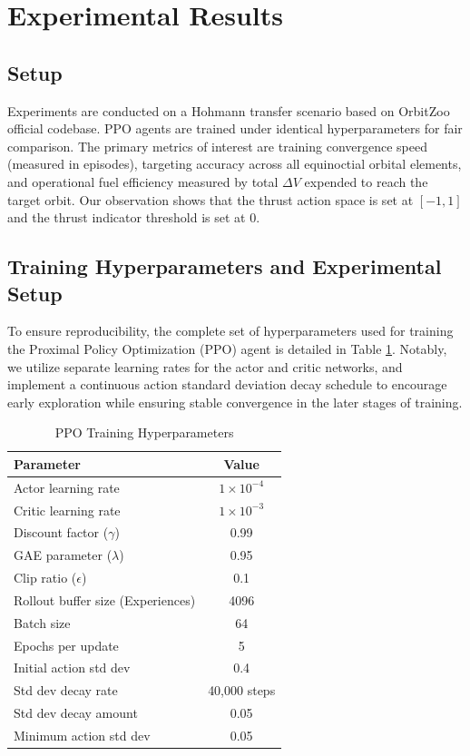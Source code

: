 \documentclass[paper]{ieice}
\begin{document}
\section{Experimental Results}
\label{Results}

\subsection{Setup}
Experiments are conducted on a Hohmann transfer scenario based on OrbitZoo official codebase. PPO agents are trained under identical hyperparameters for fair comparison. The primary metrics of interest are training convergence speed (measured in episodes), targeting accuracy across all equinoctial orbital elements, and operational fuel efficiency measured by total $\Delta V$ expended to reach the target orbit. Our observation shows that the thrust action space is set at $[-1, 1]$ and the thrust indicator threshold is set at $0$.\cite{orbitzoo}

\subsection{Training Hyperparameters and Experimental Setup}
To ensure reproducibility, the complete set of hyperparameters used for training the Proximal Policy Optimization (PPO) agent is detailed in Table \ref{tab:ppo_params}. Notably, we utilize separate learning rates for the actor and critic networks, and implement a continuous action standard deviation decay schedule to encourage early exploration while ensuring stable convergence in the later stages of training.

\begin{table}[tb]
\caption{PPO Training Hyperparameters}
\label{tab:ppo_params}
\begin{center}
\begin{tabular}{|l|c|}
\hline
\textbf{Parameter} & \textbf{Value} \\
\hline
Actor learning rate & $1 \times 10^{-4}$ \\
Critic learning rate & $1 \times 10^{-3}$ \\
Discount factor ($\gamma$) & 0.99 \\
GAE parameter ($\lambda$) & 0.95 \\
Clip ratio ($\epsilon$) & 0.1 \\
Rollout buffer size (Experiences) & 4096 \\
Batch size & 64 \\
Epochs per update & 5 \\
Initial action std dev & 0.4 \\
Std dev decay rate & 40,000 steps \\
Std dev decay amount & 0.05 \\
Minimum action std dev & 0.05 \\
\hline
\end{tabular}
\end{center}
\end{table}
\end{document}
